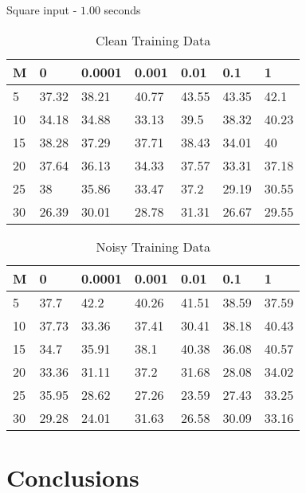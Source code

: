 \documentclass{beamer}
\begin{document}
\begin{frame}{Square input - $1.00$ seconds}
    \scriptsize
    \begin{table}[!ht]
        \centering
        \begin{tabular}{|l|l|l|l|l|l|l|}
        \hline
            M & 0 & 0.0001 & 0.001 & 0.01 & 0.1 & 1 \\ \hline
            5 & 37.32 & 38.21 & 40.77 & 43.55 & 43.35 & 42.1 \\ \hline
            10 & 34.18 & 34.88 & 33.13 & 39.5 & 38.32 & 40.23 \\ \hline
            15 & 38.28 & 37.29 & 37.71 & 38.43 & 34.01 & 40 \\ \hline
            20 & 37.64 & 36.13 & 34.33 & 37.57 & 33.31 & 37.18 \\ \hline
            25 & 38 & 35.86 & 33.47 & 37.2 & 29.19 & 30.55 \\ \hline
            30 & 26.39 & 30.01 & 28.78 & 31.31 & 26.67 & 29.55 \\ \hline
        \end{tabular}
        \caption{Clean Training Data}
    \end{table}

    \begin{table}[!ht]
        \centering
        \begin{tabular}{|l|l|l|l|l|l|l|}
        \hline
            M & 0 & 0.0001 & 0.001 & 0.01 & 0.1 & 1 \\ \hline
            5 & 37.7 & 42.2 & 40.26 & 41.51 & 38.59 & 37.59 \\ \hline
            10 & 37.73 & 33.36 & 37.41 & 30.41 & 38.18 & 40.43 \\ \hline
            15 & 34.7 & 35.91 & 38.1 & 40.38 & 36.08 & 40.57 \\ \hline
            20 & 33.36 & 31.11 & 37.2 & 31.68 & 28.08 & 34.02 \\ \hline
            25 & 35.95 & 28.62 & 27.26 & 23.59 & 27.43 & 33.25 \\ \hline
            30 & 29.28 & 24.01 & 31.63 & 26.58 & 30.09 & 33.16 \\ \hline
        \end{tabular}
        \caption{Noisy Training Data}
    \end{table}
\end{frame}


\section{Conclusions}
\end{document}
